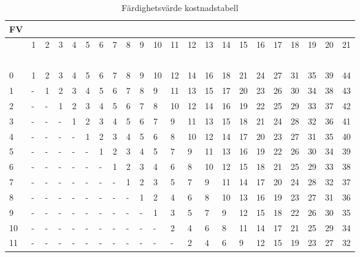 \documentclass[a4paper, 10pt, titlepage]{article}
\begin{document}
\begin{table}[hbp]
  \caption{Färdighetsvärde kostnadstabell}
  \begin{tabular}{|l|l|l|l|l|l|l|l|l|l|l|l|l|l|l|l|l|l|l|l|l|l|}
    \hline
    FV      & ~ & ~ & ~ & ~ & ~ & ~ & ~ & ~ & ~ &  ~ &  ~ &  ~ &  ~ &  ~ &  ~ &  ~ &  ~ & ~  &  ~ &  ~ & ~ \\
    \hline
    ~       & 1 & 2 & 3 & 4 & 5 & 6 & 7 & 8 & 9 & 10 & 11 & 12 & 13 & 14 & 15 & 16 & 17 & 18 & 19 & 20 & 21 \\
    \hline
    ~       & ~ & ~ & ~ & ~ & ~ & ~ & ~ & ~ & ~ & ~  & ~  & ~  & ~  & ~  & ~  & ~  & ~  & ~  & ~  & ~  & ~  \\
    \hline
    0      & 1 & 2 & 3 & 4 & 5 & 6 & 7 & 8 & 9 & 10 & 12 & 14 & 16 & 18 & 21 & 24 & 27 & 31 & 35 & 39 & 44 \\
    \hline
    1      & - & 1 & 2 & 3 & 4 & 5 & 6 & 7 & 8 &  9 & 11 & 13 & 15 & 17 & 20 & 23 & 26 & 30 & 34 & 38 & 43 \\
    \hline
    2      & - & - & 1 & 2 & 3 & 4 & 5 & 6 & 7 &  8 & 10 & 12 & 14 & 16 & 19 & 22 & 25 & 29 & 33 & 37 & 42 \\
    \hline
    3      & - & - & - & 1 & 2 & 3 & 4 & 5 & 6 &  7 &  9 & 11 & 13 & 15 & 18 & 21 & 24 & 28 & 32 & 36 & 41 \\
    \hline
    4      & - & - & - & - & 1 & 2 & 3 & 4 & 5 &  6 &  8 & 10 & 12 & 14 & 17 & 20 & 23 & 27 & 31 & 35 & 40 \\
    \hline
    5      & - & - & - & - & - & 1 & 2 & 3 & 4 &  5 &  7 &  9 & 11 & 13 & 16 & 19 & 22 & 26 & 30 & 34 & 39 \\
    \hline
    6      & - & - & - & - & - & - & 1 & 2 & 3 &  4 &  6 &  8 & 10 & 12 & 15 & 18 & 21 & 25 & 29 & 33 & 38 \\
    \hline
    7      & - & - & - & - & - & - & - & 1 & 2 &  3 &  5 &  7 &  9 & 11 & 14 & 17 & 20 & 24 & 28 & 32 & 37 \\
    \hline
    8      & - & - & - & - & - & - & - & - & 1 &  2 &  4 &  6 &  8 & 10 & 13 & 16 & 19 & 23 & 27 & 31 & 36 \\
    \hline
    9      & - & - & - & - & - & - & - & - & - &  1 &  3 &  5 &  7 &  9 & 12 & 15 & 18 & 22 & 26 & 30 & 35 \\
    \hline
    10     & - & - & - & - & - & - & - & - & - &  - &  2 &  4 &  6 &  8 & 11 & 14 & 17 & 21 & 25 & 29 & 34 \\
    \hline
    11     & - & - & - & - & - & - & - & - & - &  - &  - &  2 &  4 &  6 & 9 & 12 & 15 & 19 & 23 & 27 & 32 \\

\end{tabular}
\end{table}
\end{document}

